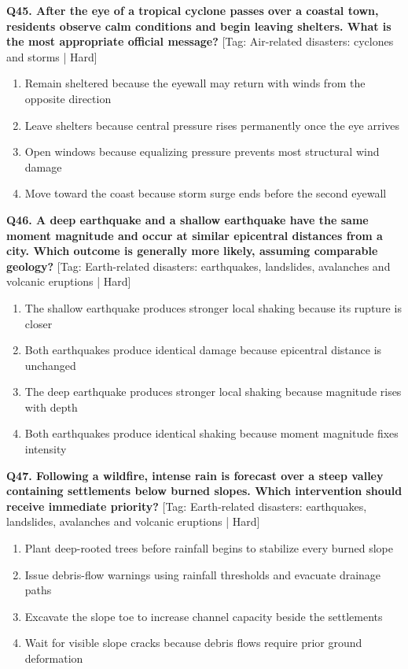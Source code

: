 \noindent\textbf{Q45. After the eye of a tropical cyclone passes over a coastal town, residents observe calm conditions and begin leaving shelters. What is the most appropriate official message?} \hfill [Tag: Air-related disasters: cyclones and storms | Hard]
\begin{enumerate}[label=(\alph*),topsep=2pt,itemsep=1pt,partopsep=0pt,parsep=0pt]
    \item {Remain sheltered because the eyewall may return with winds from the opposite direction}
    \item {Leave shelters because central pressure rises permanently once the eye arrives}
    \item {Open windows because equalizing pressure prevents most structural wind damage}
    \item {Move toward the coast because storm surge ends before the second eyewall}
\end{enumerate}
\vspace{2mm}

\noindent\textbf{Q46. A deep earthquake and a shallow earthquake have the same moment magnitude and occur at similar epicentral distances from a city. Which outcome is generally more likely, assuming comparable geology?} \hfill [Tag: Earth-related disasters: earthquakes, landslides, avalanches and volcanic eruptions | Hard]
\begin{enumerate}[label=(\alph*),topsep=2pt,itemsep=1pt,partopsep=0pt,parsep=0pt]
    \item {The shallow earthquake produces stronger local shaking because its rupture is closer}
    \item {Both earthquakes produce identical damage because epicentral distance is unchanged}
    \item {The deep earthquake produces stronger local shaking because magnitude rises with depth}
    \item {Both earthquakes produce identical shaking because moment magnitude fixes intensity}
\end{enumerate}
\vspace{2mm}

\noindent\textbf{Q47. Following a wildfire, intense rain is forecast over a steep valley containing settlements below burned slopes. Which intervention should receive immediate priority?} \hfill [Tag: Earth-related disasters: earthquakes, landslides, avalanches and volcanic eruptions | Hard]
\begin{enumerate}[label=(\alph*),topsep=2pt,itemsep=1pt,partopsep=0pt,parsep=0pt]
    \item {Plant deep-rooted trees before rainfall begins to stabilize every burned slope}
    \item {Issue debris-flow warnings using rainfall thresholds and evacuate drainage paths}
    \item {Excavate the slope toe to increase channel capacity beside the settlements}
    \item {Wait for visible slope cracks because debris flows require prior ground deformation}
\end{enumerate}
\vspace{2mm}

